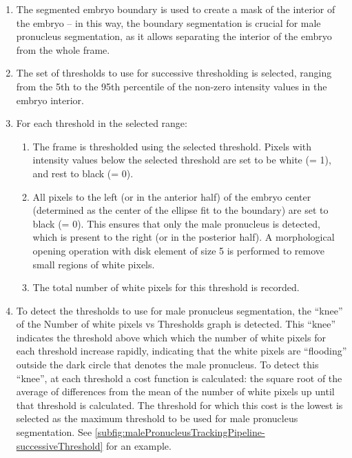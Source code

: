 \begin{enumerate}
    \item The segmented embryo boundary is used to create a mask of the interior of the embryo -- in this way, the boundary segmentation is crucial for male pronucleus segmentation, as it allows separating the interior of the embryo from the whole frame.
    \item The set of thresholds to use for successive thresholding is selected, ranging from the \num{5}th to the \num{95}th percentile of the non-zero intensity values in the embryo interior.
    \item For each threshold in the selected range:
    \begin{enumerate}
        \item The frame is thresholded using the selected threshold. Pixels with intensity values below the selected threshold are set to be white (= \num{1}), and rest to black (= \num{0}).
        \item All pixels to the left (or in the anterior half) of the embryo center (determined as the center of the ellipse fit to the boundary) are set to black (= \num{0}). This ensures that only the male pronucleus is detected, which is present to the right (or in the posterior half). A morphological opening operation with disk element of size \SI{5}{\pixels} is performed to remove small regions of white pixels.
        \item The total number of white pixels for this threshold is recorded.
    \end{enumerate}
    \item To detect the thresholds to use for male pronucleus segmentation, the \enquote{knee} of the Number of white pixels vs Thresholds graph is detected. This \enquote{knee} indicates the threshold above which which the number of white pixels for each threshold increase rapidly, indicating that the white pixels are \enquote{flooding} outside the dark circle that denotes the male pronucleus. To detect this \enquote{knee}, at each threshold a cost function is calculated: the square root of the average of differences from the mean of the number of white pixels up until that threshold is calculated. The threshold for which this cost is the lowest is selected as the maximum threshold to be used for male pronucleus segmentation. See \autoref{subfig:malePronucleusTrackingPipeline-successiveThreshold} for an example.

\end{enumerate}
